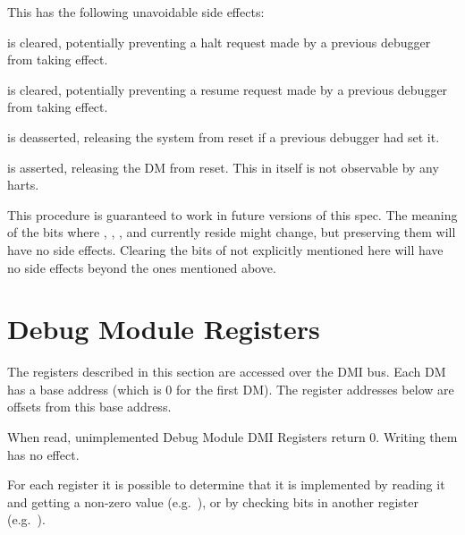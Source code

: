 \begin{steps}{This has the following unavoidable side effects:}
    \item \Fhaltreq is cleared, potentially preventing a halt request made by a
        previous debugger from taking effect.
    \item \Fresumereq is cleared, potentially preventing a resume request made
        by a previous debugger from taking effect.
    \item \Fndmreset is deasserted, releasing the system from reset if a
        previous debugger had set it.
    \item \Fdmactive is asserted, releasing the DM from reset. This in itself
        is not observable by any harts.
\end{steps}

This procedure is guaranteed to work in future versions of this spec.  The
meaning of the \Rdmcontrol bits where \Fhartreset, \Fhasel, \Fhartsello, and
\Fhartselhi currently reside might change, but preserving them will have no
side effects. Clearing the bits of \Rdmcontrol not explicitly mentioned here
will have no side effects beyond the ones mentioned above.

\section{Debug Module Registers} \label{dmdebbus}

The registers described in this section are accessed over the DMI bus.  Each DM
has a base address (which is 0 for the first DM). The register addresses below
are offsets from this base address.

When read, unimplemented Debug Module DMI Registers return 0. Writing them has
no effect.

For each register it is possible to determine that it is implemented by reading
it and getting a non-zero value (e.g.\ \Rsbcs), or by checking bits in another
register (e.g.\ \Fprogbufsize).


